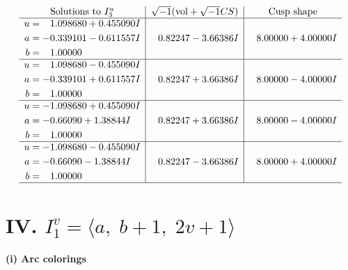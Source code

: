 \documentclass[1p]{elsarticle_modified}
\theoremstyle{definition}
\newcommand{\I}{\sqrt{-1}}
\begin{document}
$$\begin{array}{c|c|c}  
\text{Solutions to }I^u_{3}& \I (\text{vol} + \sqrt{-1}CS) & \text{Cusp shape}\\
 \hline 
\begin{aligned}
u &= \phantom{-}1.098680 + 0.455090 I \\
a &= -0.339101 - 0.611557 I \\
b &= \phantom{-}1.00000\phantom{ +0.000000I}\end{aligned}
 & \phantom{-}0.82247 - 3.66386 I & \phantom{-}8.00000 + 4.00000 I \\ \hline\begin{aligned}
u &= \phantom{-}1.098680 - 0.455090 I \\
a &= -0.339101 + 0.611557 I \\
b &= \phantom{-}1.00000\phantom{ +0.000000I}\end{aligned}
 & \phantom{-}0.82247 + 3.66386 I & \phantom{-}8.00000 - 4.00000 I \\ \hline\begin{aligned}
u &= -1.098680 + 0.455090 I \\
a &= -0.66090 + 1.38844 I \\
b &= \phantom{-}1.00000\phantom{ +0.000000I}\end{aligned}
 & \phantom{-}0.82247 + 3.66386 I & \phantom{-}8.00000 - 4.00000 I \\ \hline\begin{aligned}
u &= -1.098680 - 0.455090 I \\
a &= -0.66090 - 1.38844 I \\
b &= \phantom{-}1.00000\phantom{ +0.000000I}\end{aligned}
 & \phantom{-}0.82247 - 3.66386 I & \phantom{-}8.00000 + 4.00000 I\\
 \hline 
 \end{array}$$\newpage\newpage\renewcommand{\arraystretch}{1}
\centering \section*{IV. $I^v_{1}= \langle a,\;b+1,\;2 v+1 \rangle$}
\flushleft \textbf{(i) Arc colorings}\\
\end{document}
